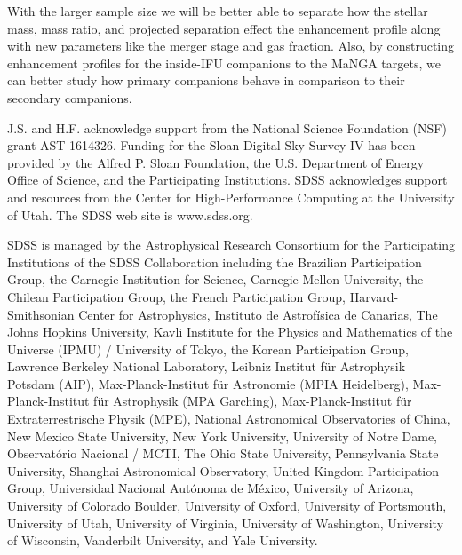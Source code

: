 \documentclass[iop,revtex4,twocolumn,apj,numberedappendix,appendixfloats]{emulateapj}
\begin{document}
With the larger sample size we will be better able to separate how the stellar mass, mass ratio, and projected separation effect the enhancement profile along with new parameters like the merger stage and gas fraction. Also, by constructing enhancement profiles for the inside-IFU companions to the MaNGA targets, we can better study how primary companions behave in comparison to their secondary companions. 

\acknowledgments

J.S. and H.F. acknowledge support from the National Science Foundation (NSF) grant AST-1614326. Funding for the Sloan Digital Sky Survey IV has been provided by the Alfred P. Sloan Foundation, the U.S. Department of Energy Office of Science, and the Participating Institutions. SDSS acknowledges support and resources from the Center for High-Performance Computing at the University of Utah. The SDSS web site is www.sdss.org.

SDSS is managed by the Astrophysical Research Consortium for the Participating Institutions of the SDSS Collaboration including the Brazilian Participation Group, the Carnegie Institution for Science, Carnegie Mellon University, the Chilean Participation Group, the French Participation Group, Harvard-Smithsonian Center for Astrophysics, Instituto de Astrofísica de Canarias, The Johns Hopkins University, Kavli Institute for the Physics and Mathematics of the Universe (IPMU) / University of Tokyo, the Korean Participation Group, Lawrence Berkeley National Laboratory, Leibniz Institut für Astrophysik Potsdam (AIP), Max-Planck-Institut für Astronomie (MPIA Heidelberg), Max-Planck-Institut für Astrophysik (MPA Garching), Max-Planck-Institut für Extraterrestrische Physik (MPE), National Astronomical Observatories of China, New Mexico State University, New York University, University of Notre Dame, Observatório Nacional / MCTI, The Ohio State University, Pennsylvania State University, Shanghai Astronomical Observatory, United Kingdom Participation Group, Universidad Nacional Autónoma de México, University of Arizona, University of Colorado Boulder, University of Oxford, University of Portsmouth, University of Utah, University of Virginia, University of Washington, University of Wisconsin, Vanderbilt University, and Yale University.



\end{document}
